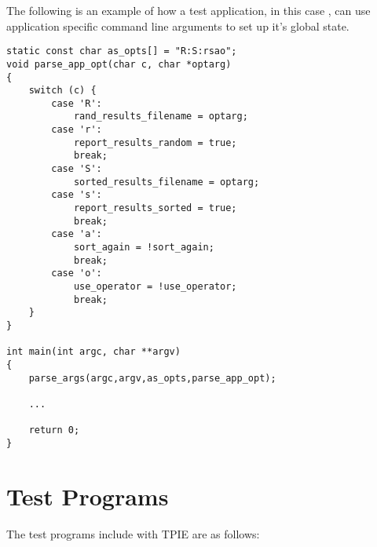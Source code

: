 The following is an example of how a test application, in this case
, can use application specific command line
arguments to set up it's global state.

\begin{verbatim}
static const char as_opts[] = "R:S:rsao";
void parse_app_opt(char c, char *optarg)
{
    switch (c) {
        case 'R':
            rand_results_filename = optarg;
        case 'r':
            report_results_random = true;
            break;
        case 'S':
            sorted_results_filename = optarg;
        case 's':
            report_results_sorted = true;
            break;
        case 'a':
            sort_again = !sort_again;
            break;
        case 'o':
            use_operator = !use_operator;
            break;
    }
}

int main(int argc, char **argv)
{
    parse_args(argc,argv,as_opts,parse_app_opt);

    ...

    return 0;
}
\end{verbatim}

\section{Test Programs}

The test programs include with TPIE are as follows:

